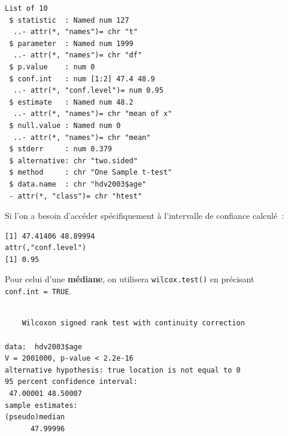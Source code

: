 \documentclass[
  letterpaper,
  DIV=11,
  numbers=noendperiod,
  oneside]{scrreprt}
\newenvironment{Shaded}{\begin{snugshade}}{\end{snugshade}}
\newcommand{\AttributeTok}[1]{\textcolor[rgb]{0.40,0.45,0.13}{#1}}
\newcommand{\ConstantTok}[1]{\textcolor[rgb]{0.56,0.35,0.01}{#1}}
\newcommand{\FunctionTok}[1]{\textcolor[rgb]{0.28,0.35,0.67}{#1}}
\newcommand{\NormalTok}[1]{\textcolor[rgb]{0.00,0.23,0.31}{#1}}
\newcommand{\SpecialCharTok}[1]{\textcolor[rgb]{0.37,0.37,0.37}{#1}}
\newcommand{\StringTok}[1]{\textcolor[rgb]{0.13,0.47,0.30}{#1}}
\begin{document}
\begin{verbatim}
List of 10
 $ statistic  : Named num 127
  ..- attr(*, "names")= chr "t"
 $ parameter  : Named num 1999
  ..- attr(*, "names")= chr "df"
 $ p.value    : num 0
 $ conf.int   : num [1:2] 47.4 48.9
  ..- attr(*, "conf.level")= num 0.95
 $ estimate   : Named num 48.2
  ..- attr(*, "names")= chr "mean of x"
 $ null.value : Named num 0
  ..- attr(*, "names")= chr "mean"
 $ stderr     : num 0.379
 $ alternative: chr "two.sided"
 $ method     : chr "One Sample t-test"
 $ data.name  : chr "hdv2003$age"
 - attr(*, "class")= chr "htest"
\end{verbatim}

Si l'on a besoin d'accéder spécifiquement à l'intervalle de confiance
calculé~:

\begin{Shaded}
\end{Shaded}

\begin{verbatim}
[1] 47.41406 48.89994
attr(,"conf.level")
[1] 0.95
\end{verbatim}

Pour celui d'une \textbf{médiane}, on utilisera \texttt{wilcox.test()}
en précisant \texttt{conf.int\ =\ TRUE}.

\begin{Shaded}
\end{Shaded}

\begin{verbatim}

    Wilcoxon signed rank test with continuity correction

data:  hdv2003$age
V = 2001000, p-value < 2.2e-16
alternative hypothesis: true location is not equal to 0
95 percent confidence interval:
 47.00001 48.50007
sample estimates:
(pseudo)median 
      47.99996 
\end{verbatim}
\end{document}
